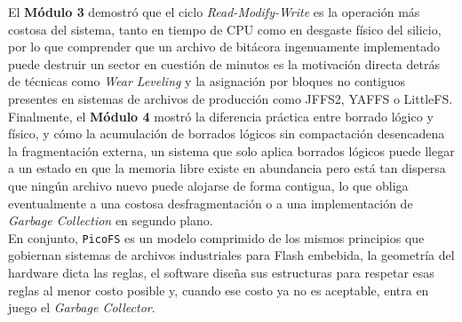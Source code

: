 \documentclass[12pt,letterpaper]{article}
\begin{document}
El \textbf{Módulo 3} demostró que el ciclo \textit{Read-Modify-Write} es la operación más costosa del sistema,
tanto en tiempo de CPU como en desgaste físico del silicio, por lo que comprender que un archivo de bitácora
ingenuamente implementado puede destruir un sector en cuestión de minutos es la motivación directa detrás de
técnicas como \textit{Wear Leveling} y la asignación por bloques no contiguos presentes en sistemas de archivos
de producción como JFFS2, YAFFS o LittleFS.\\

Finalmente, el \textbf{Módulo 4} mostró la diferencia práctica entre borrado lógico y físico, y cómo la
acumulación de borrados lógicos sin compactación desencadena la fragmentación externa, un sistema que solo
aplica borrados lógicos puede llegar a un estado en que la memoria libre existe en abundancia pero está tan
dispersa que ningún archivo nuevo puede alojarse de forma contigua, lo que obliga eventualmente a una costosa
desfragmentación o a una implementación de \textit{Garbage Collection} en segundo plano.\\

En conjunto, \texttt{PicoFS} es un modelo comprimido de los mismos principios que gobiernan sistemas de archivos
industriales para Flash embebida, la geometría del hardware dicta las reglas, el software diseña sus estructuras
para respetar esas reglas al menor costo posible y, cuando ese costo ya no es aceptable, entra en juego el
\textit{Garbage Collector}.
\end{document}
